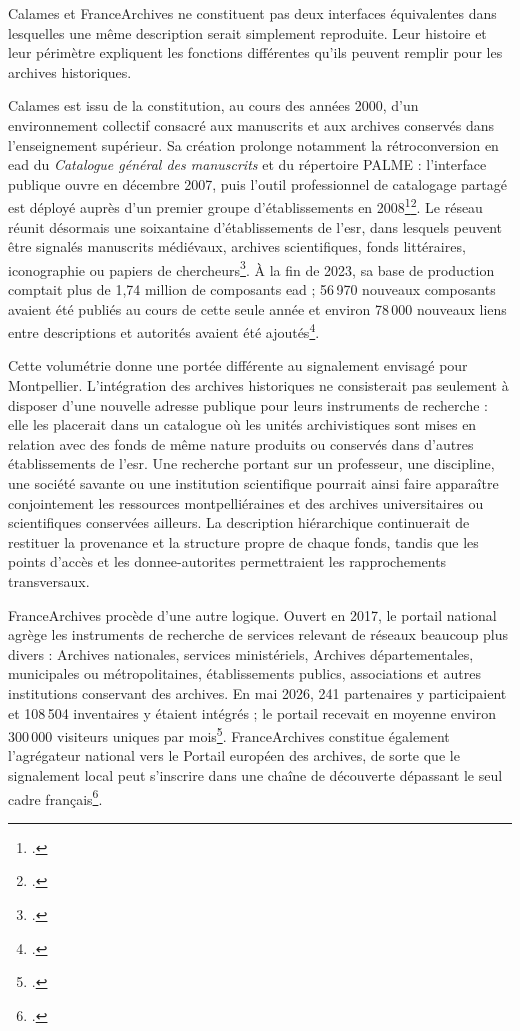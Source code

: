 Calames et FranceArchives ne constituent pas deux interfaces équivalentes dans lesquelles une même description serait simplement reproduite. Leur histoire et leur périmètre expliquent les fonctions différentes qu'ils peuvent remplir pour les archives historiques.

Calames est issu de la constitution, au cours des années 2000, d'un environnement collectif consacré aux manuscrits et aux archives conservés dans l'enseignement supérieur. Sa création prolonge notamment la rétroconversion en \gls{ead} du \emph{Catalogue général des manuscrits} et du répertoire PALME : l'interface publique ouvre en décembre 2007, puis l'outil professionnel de catalogage partagé est déployé auprès d'un premier groupe d'établissements en 2008\footcite{AbesHistoireCalames}\footcite{NoelCalames2020}. Le réseau réunit désormais une soixantaine d'établissements de l'\gls{esr}, dans lesquels peuvent être signalés manuscrits médiévaux, archives scientifiques, fonds littéraires, iconographie ou papiers de chercheurs\footcite{AbesCatalogueCalames2026}. À la fin de 2023, sa base de production comptait plus de 1,74 million de composants \gls{ead} ; 56\,970 nouveaux composants avaient été publiés au cours de cette seule année et environ 78\,000 nouveaux liens entre descriptions et autorités  avaient été ajoutés\footcite{AbesCalamesStat2023}.

Cette volumétrie donne une portée différente au \gls{signalement} envisagé pour Montpellier. L'intégration des archives historiques ne consisterait pas seulement à disposer d'une nouvelle adresse publique pour leurs instruments de recherche : elle les placerait dans un catalogue où les unités archivistiques sont mises en relation avec des fonds de même nature produits ou conservés dans d'autres établissements de l'\gls{esr}. Une recherche portant sur un professeur, une discipline, une société savante ou une institution scientifique pourrait ainsi faire apparaître conjointement les ressources montpelliéraines et des archives universitaires ou scientifiques conservées ailleurs. La description hiérarchique continuerait de restituer la provenance et la structure propre de chaque fonds, tandis que les points d'accès et les \glspl{donnee-autorite} permettraient les rapprochements transversaux.

FranceArchives procède d'une autre logique. Ouvert en 2017, le portail national agrège les instruments de recherche de services relevant de réseaux beaucoup plus divers : Archives nationales, services ministériels, Archives départementales, municipales ou métropolitaines, établissements publics, associations et autres institutions conservant des archives. En mai 2026, 241 partenaires y participaient et 108\,504 inventaires y étaient intégrés ; le portail recevait en moyenne environ 300\,000 visiteurs uniques par mois\footcite{FranceArchivesRejoindre2026}. FranceArchives constitue également l'agrégateur national vers le Portail européen des archives, de sorte que le \gls{signalement} local peut s'inscrire dans une chaîne de découverte dépassant le seul cadre français\footcite{FranceArchivesRejoindre2026}.

